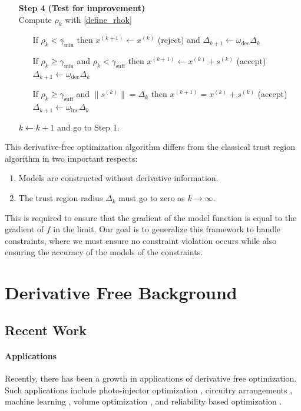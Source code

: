 \documentclass{article}
\theoremstyle{case}
\numberwithin{theorem}{subsection}
\newcommand{\gammabi}{\gamma_{\textrm{suff}}}
\newcommand{\gammasm}{\gamma_{\textrm{min}}}
\newcommand{\mfk}{{{m}_f}^{(k)}}
\newcommand{\omegadec}{\omega_{\text{dec}}}
\newcommand{\omegainc}{\omega_{\text{inc}}}
\newcommand{\rk}{\rho_k}
\newcommand{\sk}{{{s}^{(k)}}}
\newcommand{\xkpo}{{{x}^{(k+1)}}}
\newcommand{\xk}{x^{(k)}}
\begin{document}
\begin{algorithm}[H]
\begin{itemize}
        \item[\textbf{Step 4}] \textbf{(Test for improvement)} \\
            Compute $\rk$ with \cref{define_rhok} \begin{itemize}
                \item[] If $\rk < \gammasm$ then $\xkpo \gets \xk$ (reject) and $\Delta_{k+1} \gets \omegadec\Delta_{k}$
                \item[] If $\rk \ge \gammasm$ and $\rk < \gammabi$ then $\xkpo\gets\xk+\sk$ (accept) $\Delta_{k+1} \gets \omegadec\Delta_{k}$
                \item[] If $\rk \ge \gammabi$ and $\|\sk\| = \Delta_{k}$ then $\xkpo=\xk+\sk$ (accept) $\Delta_{k+1} \gets \omegainc\Delta_{k}$
            \end{itemize}
            $k \gets k+1$ and go to Step 1.
    \end{itemize}
\end{algorithm}

This derivative-free optimization algorithm differs from the classical trust region algorithm in two important respects:
\begin{enumerate}
    \item Models are constructed without derivative information.
    \item The trust region radius $\Delta_k$ must go to zero as $k\to\infty$.
\end{enumerate}

This is required to ensure that the gradient of the model function is equal to the gradient of $f$ in the limit.
Our goal is to generalize this framework to handle constraints, where we must ensure no constraint violation occurs while also ensuring the accuracy of the models of the constraints.

\section{Derivative Free Background}
\subsection{Recent Work}
\paragraph{Applications}

Recently, there has been a growth in applications of derivative free optimization.
Such applications include photo-injector optimization \cite{1742-6596-874-1-012062}, circuitry arrangements \cite{PLOSKAS201816}, machine learning \cite{KS2018}, volume optimization \cite{Cheng2017}, and reliability based optimization \cite{Gao2017}.
\end{document}
